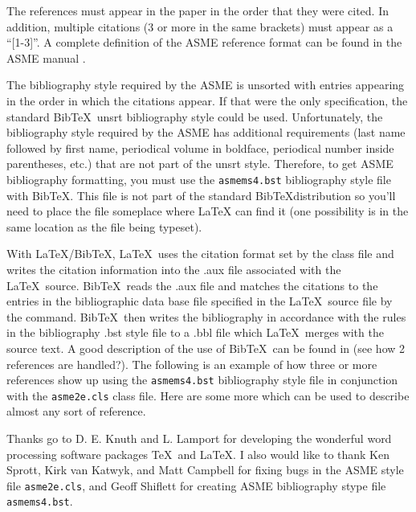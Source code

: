 \documentclass[twocolumn,10pt]{asme2e}
\newcommand\BibTeX{{\sc Bib}\TeX}
\begin{document}
The references must appear in the paper in the order that they were cited.
In addition, multiple citations (3 or more in the same brackets) must appear as a ``[1-3]''.
A complete definition of the ASME reference format can be found in the ASME manual \cite{asmemanual}.

The bibliography style required by the ASME is unsorted with entries appearing in the order in which the citations appear.
If that were the only specification, the standard \BibTeX\ unsrt bibliography style could be used.
Unfortunately, the bibliography style required by the ASME has additional requirements (last name followed by first name, periodical volume in boldface, periodical number inside parentheses, etc.) that are not part of the unsrt style.
Therefore, to get ASME bibliography formatting, you must use the \verb+asmems4.bst+ bibliography style file with \BibTeX. This file is not part of the standard \BibTeX distribution so you'll need to place the file someplace where LaTeX can find it (one possibility is in the same location as the file being typeset).

With \LaTeX/\BibTeX, \LaTeX\ uses the citation format set by the class file and writes the citation information into the .aux file associated with the \LaTeX\ source.
\BibTeX\ reads the .aux file and matches the citations to the entries in the bibliographic data base file specified in the \LaTeX\ source file by the \verb++ command.
\BibTeX\ then writes the bibliography in accordance with the rules in the bibliography .bst style file to a .bbl file which \LaTeX\ merges with the source text.
A good description of the use of \BibTeX\ can be found in \cite{latex, goosens} (see how 2 references are handled?).
The following is an example of how three or more references \cite{latex, asmemanual, goosens} show up using the \verb+asmems4.bst+ bibliography style file in conjunction with the \verb+asme2e.cls+ class file.
Here are some more \cite{art, blt, ibk, icn, ips, mts, mis, pro, pts, trt, upd} which can be used to describe almost any sort of reference.




\begin{acknowledgment}
 Thanks go to D. E. Knuth and L. Lamport for developing the wonderful word processing software packages \TeX\ and \LaTeX. I also would like to thank Ken Sprott, Kirk van Katwyk, and Matt Campbell for fixing bugs in the ASME style file \verb+asme2e.cls+, and Geoff Shiflett for creating ASME bibliography stype file \verb+asmems4.bst+.
\end{acknowledgment}
\end{document}
